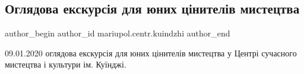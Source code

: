  
 
 
 
 

\subsection{Оглядова екскурсія для юних цінителів мистецтва}
\label{sec:08_01_2020.fb.mariupol.centr.kuindzhi.1.ogljadova_ekskursia_dlja_junyh_cinyteliv_mystectva}

\ifcmt
 author_begin
   author_id mariupol.centr.kuindzhi
 author_end
\fi

09.01.2020 оглядова екскурсія для юних цінителів мистецтва у Центрі сучасного
мистецтва і культури ім. Куїнджі.
